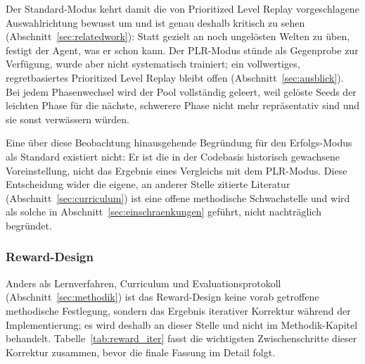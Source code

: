 \documentclass[11pt,a4paper]{article}
\begin{document}
Der Standard-Modus kehrt damit die von Prioritized Level Replay
vorgeschlagene Auswahlrichtung bewusst um und ist genau deshalb kritisch zu
sehen (Abschnitt~\ref{sec:relatedwork}): Statt gezielt an noch ungelösten
Welten zu üben, festigt der Agent, was er schon kann. Der PLR-Modus stünde
als Gegenprobe zur Verfügung, wurde aber nicht systematisch trainiert; ein
vollwertiges, regretbasiertes Prioritized Level Replay bleibt offen
(Abschnitt~\ref{sec:ausblick}). Bei jedem Phasenwechsel wird der Pool
vollständig geleert, weil gelöste Seeds der leichten Phase für die nächste,
schwerere Phase nicht mehr repräsentativ sind und sie sonst verwässern
würden.

Eine über diese Beobachtung hinausgehende Begründung für den Erfolgs-Modus
als Standard existiert nicht: Er ist die in der Codebasis historisch
gewachsene Voreinstellung, nicht das Ergebnis eines Vergleichs mit dem
PLR-Modus. Diese Entscheidung wider die eigene, an anderer Stelle zitierte
Literatur (Abschnitt~\ref{sec:curriculum}) ist eine offene methodische
Schwachstelle und wird als solche in Abschnitt~\ref{sec:einschraenkungen}
geführt, nicht nachträglich begründet.

\subsubsection{Reward-Design}
\label{sec:rewarddesign}

Anders als Lernverfahren, Curriculum und Evaluationsprotokoll
(Abschnitt~\ref{sec:methodik}) ist das Reward-Design keine vorab getroffene
methodische Festlegung, sondern das Ergebnis iterativer Korrektur während der
Implementierung; es wird deshalb an dieser Stelle und nicht im
Methodik-Kapitel behandelt. Tabelle~\ref{tab:reward_iter} fasst die
wichtigsten Zwischenschritte dieser Korrektur zusammen, bevor die finale
Fassung im Detail folgt.
\end{document}
